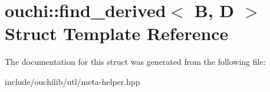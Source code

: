 \hypertarget{structouchi_1_1find__derived}{}\section{ouchi\+::find\+\_\+derived$<$ B, D $>$ Struct Template Reference}
\label{structouchi_1_1find__derived}


The documentation for this struct was generated from the following file\+:\begin{DoxyCompactItemize}
\item 
include/ouchilib/utl/meta-\/helper.\+hpp\end{DoxyCompactItemize}
